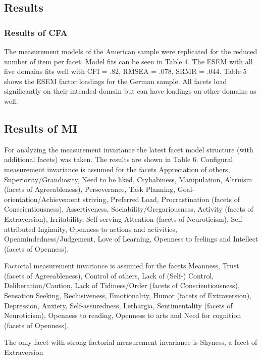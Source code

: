 \documentclass[,man,floatsintext]{apa6}
\theoremstyle{definition}
\theoremstyle{definition}
\theoremstyle{definition}
\theoremstyle{remark}
\begin{document}
\hypertarget{results-1}{%
\subsection{Results}\label{results-1}}

\hypertarget{results-of-cfa}{%
\subsubsection{Results of CFA}\label{results-of-cfa}}

The measurement models of the American sample were replicated for the
reduced number of item per facet. Model fits can be seen in Table 4. The
ESEM with all five domains fits well with CFI = .82, RMSEA = .078, SRMR
= .044. Table 5 shows the ESEM factor loadings for the German sample.
All facets load significantly on their intended domain but can have
loadings on other domains as well.

\hypertarget{results-of-mi}{%
\subsection{Results of MI}\label{results-of-mi}}

For analyzing the measurement invariance the latest facet model
structure (with additional facets) was taken. The results are shown in
Table 6. Configural measurement invariance is assumed for the facets
Appreciation of others, Superiority/Grandiosity, Need to be liked,
Crybabiness, Manipulation, Altruism (facets of Agreeableness),
Perseverance, Task Planning, Goal-orientation/Achievement striving,
Preferred Load, Procrastination (facets of Conscientiousness),
Assertiveness, Sociability/Gregariousness, Activity (facets of
Extraversion), Irritability, Self-serving Attention (facets of
Neuroticism), Self-attributed Inginuity, Openness to actions and
activities, Openmindedness/Judgement, Love of Learning, Openness to
feelings and Intellect (facets of Openness).

Factorial measurement invariance is assumed for the facets Meanness,
Trust (facets of Agreeableness), Control of others, Lack of (Self-)
Control, Deliberation/Caution, Lack of Tidiness/Order (facets of
Conscientiousness), Sensation Seeking, Reclusiveness, Emotionality,
Humor (facets of Extraversion), Depression, Anxiety, Self-assuredness,
Lethargia, Sentimentality (facets of Neuroticism), Openness to reading,
Openness to arts and Need for cognition (facets of Openness).

The only facet with strong factorial measurement invariance is Shyness,
a facet of Extraversion
\end{document}
